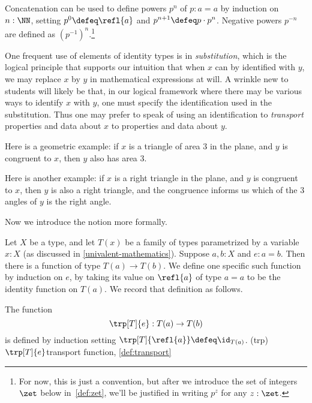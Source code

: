 Concatenation can be used to define powers $p^n$ of $p:a=a$
by induction on $n:\NN$, setting $p^0\defeq\refl{a}$ and
$p^{n+1}\defeq p\cdot p^n$. Negative powers $p^{-n}$ are defined
as $(p^{-1})^n$.\footnote{For now, this is just a convention,
  but after we introduce the set of integers $\zet$ below in~\cref{def:zet},
  we'll be justified in writing $p^z$ for any $z:\zet$.}

One frequent use of elements of identity types is in \emph{substitution}, which is
the logical principle that supports our intuition that when $x$ can by identified with $y$, we may replace $x$ by $y$
in mathematical expressions at will.  A wrinkle new to students will likely be that, in our logical framework
where there may be various ways to identify $x$ with $y$, one must specify the identification used in the substitution.
Thus one may prefer to speak of using an identification to \emph{transport} properties and data about $x$ to properties and data about $y$.

Here is a geometric example: if $x$ is a triangle of area $3$ in the plane, and $y$ is congruent to $x$, then $y$ also has area $3$.

Here is another example: if $x$ is a right triangle in the plane, and $y$ is congruent to $x$, then $y$ is also a right triangle, and
the congruence informs us which of the $3$ angles of $y$ is the right angle.

Now we introduce the notion more formally.

Let $X$ be a type, and let $T(x)$ be a family of types parametrized by a variable $x:X$ (as discussed in \cref{univalent-mathematics}).
Suppose $a,b:X$ and $e:a=b$.
Then there is a function of type $T(a) \to T(b)$.
We define one specific such function by induction on $e$,
by taking its value on $\refl{a}$ of type $a=a$ to be the identity function on $T(a)$.
We record that definition as follows.

\begin{definition}\label{def:transport} The function
  \[
  \trp[T]{e} : T(a) \to T(b)
  \]
  is defined by induction setting $\trp[T]{\refl{a}} \defeq \id_{T(a)}$.%
  \glossary(trp){$\protect\trp[T]{e}$}{transport function, \cref{def:transport}}
\end{definition}

